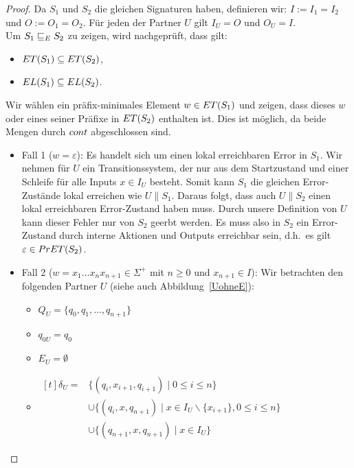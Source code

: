 \begin{proof}
  Da $S_1$ und $S_2$ die gleichen Signaturen haben, definieren wir:
  $I:=I_1=I_2$ und $O:=O_1=O_2$. Für jeden der Partner $U$ gilt $I_U=O$ und
  $O_U=I$.\\%
  Um $S_1\ERel S_2$ zu zeigen, wird nachgeprüft, dass gilt:
  \begin{itemize}
    \item $\ET{}(S_1)\subseteq \ET{}(S_2)$,
    \item $\EL{}(S_1)\subseteq \EL{}(S_2)$.
  \end{itemize}
  Wir wählen ein präfix-minimales Element $w\in \ET{}(S_1)$ und
  zeigen, dass dieses $w$ oder eines seiner Präfixe in $\ET{}(S_2)$ enthalten ist.
  Dies ist möglich, da beide Mengen durch $\cont{}$ abgeschlossen sind.
  \begin{itemize}
    \item Fall 1 ($w=\varepsilon$): Es handelt sich um einen lokal erreichbaren
      Error in $S_1$.
      Wir nehmen für $U$ ein Transitionssystem, der nur aus dem Startzustand und
      einer Schleife für alle Inputs $x\in I_U$ besteht. Somit kann $S_1$ die gleichen
      Error-Zustände lokal erreichen wie $U\|S_1$. Daraus folgt, dass auch
      $U\|S_2$ einen lokal erreichbaren Error-Zustand haben muss. Durch unsere
      Definition von $U$ kann dieser Fehler nur von $S_2$ geerbt werden. Es
      muss also in $S_2$ ein Error-Zustand durch interne Aktionen und Outputs
      erreichbar sein, d.h.\ es gilt $\varepsilon\in \PrET{}(S_2)$.
    \item Fall 2 ($w=x_1\dots x_n x_{n+1}\in\Sigma ^+$ mit $n\geq 0$ und
      $x_{n+1}\in I$): Wir betrachten den folgenden Partner $U$ (siehe auch
      Abbildung~\ref{UohneE}):
      \begin{itemize}
        \item $Q_U=\{q_0,q_1,\dots ,q_{n+1}\}$
        \item $q_{0U}=q_0$
        \item $E_U=\emptyset$
        \item $\begin{aligned}[t]
            \delta _U=&\{(q_i,x_{i+1},q_{i+1})\mid  0\leq i\leq n\}\\
                      &\cup\{(q_i,x,q_{n+1})\mid  x\in I_U\backslash\{x_{i+1}\},
          0\leq i\leq n\}\\
          &\cup\{(q_{n+1},x,q_{n+1})\mid  x\in I_U\}
        \end{aligned}$
      \end{itemize}
      \begin{figure} [h!tbp]
      \begin{center}
        \begin{tikzpicture}[->, >=latex',auto,node distance =3cm, semithick]


\end{tikzpicture}
\end{center}
\end{figure}
\end{itemize}
\end{proof}
